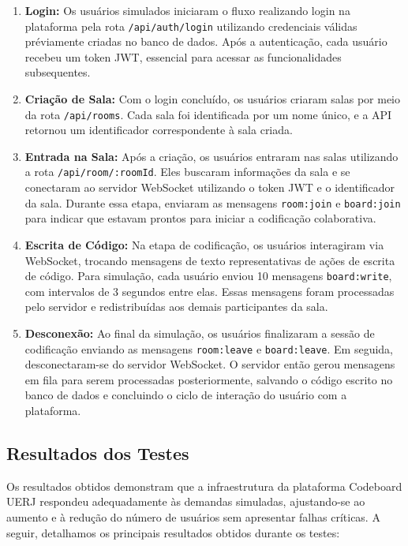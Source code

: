 \begin{enumerate}
    \item \textbf{Login:} Os usuários simulados iniciaram o fluxo realizando login na plataforma pela rota \texttt{/api/auth/login} utilizando credenciais válidas préviamente criadas no banco de dados. Após a autenticação, cada usuário recebeu um token JWT, essencial para acessar as funcionalidades subsequentes.
    \item \textbf{Criação de Sala:} Com o login concluído, os usuários criaram salas por meio da rota \texttt{/api/rooms}. Cada sala foi identificada por um nome único, e a API retornou um identificador correspondente à sala criada.
    \item \textbf{Entrada na Sala:} Após a criação, os usuários entraram nas salas utilizando a rota \texttt{/api/room/:roomId}. Eles buscaram informações da sala e se conectaram ao servidor WebSocket utilizando o token JWT e o identificador da sala. Durante essa etapa, enviaram as mensagens \texttt{room:join} e \texttt{board:join} para indicar que estavam prontos para iniciar a codificação colaborativa.
    \item \textbf{Escrita de Código:} Na etapa de codificação, os usuários interagiram via WebSocket, trocando mensagens de texto representativas de ações de escrita de código. Para simulação, cada usuário enviou 10 mensagens \texttt{board:write}, com intervalos de 3 segundos entre elas. Essas mensagens foram processadas pelo servidor e redistribuídas aos demais participantes da sala.
    \item \textbf{Desconexão:} Ao final da simulação, os usuários finalizaram a sessão de codificação enviando as mensagens \texttt{room:leave} e \texttt{board:leave}. Em seguida, desconectaram-se do servidor WebSocket. O servidor então gerou mensagens em fila para serem processadas posteriormente, salvando o código escrito no banco de dados e concluindo o ciclo de interação do usuário com a plataforma.
\end{enumerate}


\subsection{Resultados dos Testes}

Os resultados obtidos demonstram que a infraestrutura da plataforma Codeboard UERJ respondeu adequadamente às demandas simuladas, ajustando-se ao aumento e à redução do número de usuários sem apresentar falhas críticas. A seguir, detalhamos os principais resultados obtidos durante os testes:

